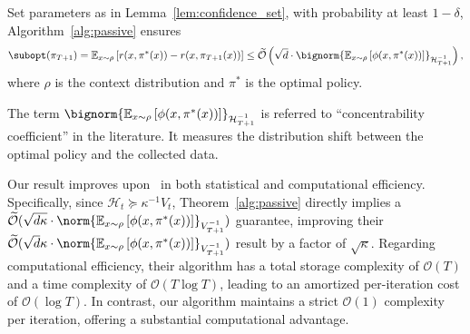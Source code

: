 \begin{myThm}
  \label{thm:passive}
  Set parameters as in Lemma~\ref{lem:confidence_set}, with probability at least $1-\delta$, Algorithm~\ref{alg:passive} ensures
  \begin{align*}
    {\subopt}(\pi_{T+1}) = \mathbb{E}_{x \sim \rho} \left[r(x, \pi^*(x)) - r(x, \pi_{T+1}(x))\right] \leq \widetilde{\mathcal{O}} \left(\sqrt{d} \cdot \bignorm{\mathbb{E}_{x \sim \rho} \left[\phi(x,\pi^*(x))\right]}_{\mathcal{H}_{T+1}^{-1}} \right),
  \end{align*}
  where $\rho$ is the context distribution and $\pi^*$ is the optimal policy.
\end{myThm}
\begin{myRemark}
  The term $\bignorm{\mathbb{E}_{x \sim \rho} \left[\phi(x,\pi^*(x))\right]}_{\mathcal{H}_{T+1}^{-1}}$ is referred to ``concentrability coefficient'' in the literature. It measures the distribution shift between the optimal policy and the collected data.
\end{myRemark}

\begin{myRemark}
Our result improves upon~\citet{ICML'23:Zhu-Principled} in both statistical and computational efficiency. Specifically, since $\mathcal{H}_t \succeq \kappa^{-1} V_t$, Theorem~\ref{alg:passive} directly implies a $\widetilde{\mathcal{O}} (\sqrt{d \kappa} \cdot \norm{\mathbb{E}_{x \sim \rho} \left[\phi(x,\pi^*(x))\right]}_{V_{T+1}^{-1}} )$ guarantee, improving their $\widetilde{\mathcal{O}} (\sqrt{d} \kappa \cdot \norm{\mathbb{E}_{x \sim \rho} \left[\phi(x,\pi^*(x))\right]}_{V_{T+1}^{-1}} )$ result by a factor of $\sqrt{\kappa}$. Regarding computational efficiency, their algorithm has a total storage complexity of $\mathcal{O}(T)$ and a time complexity of $\mathcal{O}(T \log T)$, leading to an amortized per-iteration cost of $\mathcal{O}(\log T)$. In contrast, our algorithm maintains a strict $\mathcal{O}(1)$ complexity per iteration, offering a substantial computational advantage.
\end{myRemark}

